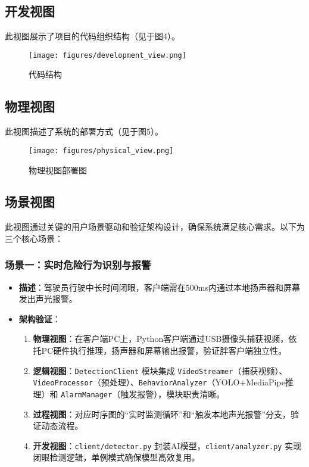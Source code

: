 \documentclass[a4paper,12pt]{article}
\begin{document}
\subsection{开发视图}
此视图展示了项目的代码组织结构（见于图4）。

\begin{figure}[h]
  \centering
  \texttt{[image: figures/development\_view.png]}
  \caption{代码结构}
  \label{fig:development_view}
\end{figure}

\subsection{物理视图}
此视图描述了系统的部署方式（见于图5）。

\begin{figure}[h]
  \centering
  \texttt{[image: figures/physical\_view.png]}
  \caption{物理视图部署图}
  \label{fig:physical_view}
\end{figure}

\subsection{场景视图}
此视图通过关键的用户场景驱动和验证架构设计，确保系统满足核心需求。以下为三个核心场景：

\subsubsection{场景一：实时危险行为识别与报警}
\begin{itemize}
  \item \textbf{描述}：驾驶员行驶中长时间闭眼，客户端需在500ms内通过本地扬声器和屏幕发出声光报警。
  \item \textbf{架构验证}：
    \begin{enumerate}
      \item \textbf{物理视图}：在客户端PC上，Python客户端通过USB摄像头捕获视频，依托PC硬件执行推理，扬声器和屏幕输出报警，验证胖客户端独立性。
      \item \textbf{逻辑视图}：\texttt{DetectionClient} 模块集成 \texttt{VideoStreamer}（捕获视频）、\texttt{VideoProcessor}（预处理）、\texttt{BehaviorAnalyzer}（YOLO+MediaPipe推理）和 \texttt{AlarmManager}（触发报警），模块职责清晰。
      \item \textbf{过程视图}：对应时序图的“实时监测循环”和“触发本地声光报警”分支，验证动态流程。
      \item \textbf{开发视图}：\texttt{client/detector.py} 封装AI模型，\texttt{client/analyzer.py} 实现闭眼检测逻辑，单例模式确保模型高效复用。
    \end{enumerate}
\end{itemize}
\end{document}
